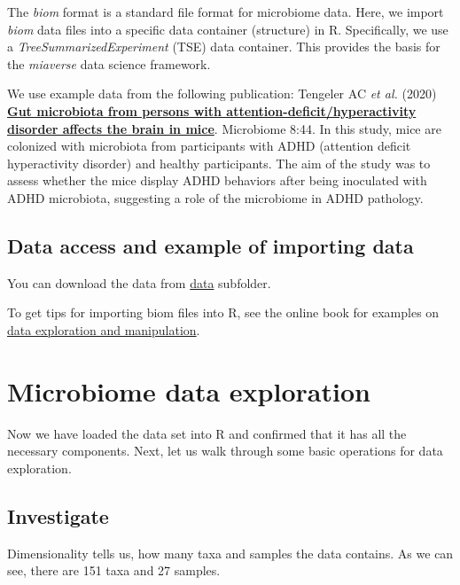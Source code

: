 \documentclass[
  oneside]{book}
\begin{document}
The \emph{biom} format is a standard file format for microbiome data. Here,
we import \emph{biom} data files into a specific data container (structure)
in R. Specifically, we use a \emph{TreeSummarizedExperiment} (TSE) data
container. This provides the basis for the \emph{miaverse} data science
framework.

We use example data from the following publication: Tengeler AC \emph{et
al.} (2020) \href{https://doi.org/10.1186/s40168-020-00816-x}{\textbf{Gut microbiota from persons with
attention-deficit/hyperactivity disorder affects the brain in
mice}}. Microbiome
8:44. In this study, mice are colonized with microbiota from
participants with ADHD (attention deficit hyperactivity disorder) and
healthy participants. The aim of the study was to assess whether the
mice display ADHD behaviors after being inoculated with ADHD
microbiota, suggesting a role of the microbiome in ADHD pathology.

\hypertarget{data-access-and-example-of-importing-data}{%
\section{Data access and example of importing data}\label{data-access-and-example-of-importing-data}}

You can download the data from
\href{https://github.com/microbiome/course_2021_radboud/tree/main/data}{data}
subfolder.

To get tips for importing biom files into R, see the online book for examples on
\href{https://microbiome.github.io/OMA/data-introduction.html\#loading-experimental-microbiome-data}{data exploration and manipulation}.

\hypertarget{microbiome-data-exploration}{%
\chapter{Microbiome data exploration}\label{microbiome-data-exploration}}

Now we have loaded the data set into R and confirmed that it has all
the necessary components. Next, let us walk through some basic
operations for data exploration.

\hypertarget{investigate}{%
\section{Investigate}\label{investigate}}

Dimensionality tells us, how many taxa and samples the data contains. As we can see,
there are 151 taxa and 27 samples.
\end{document}
